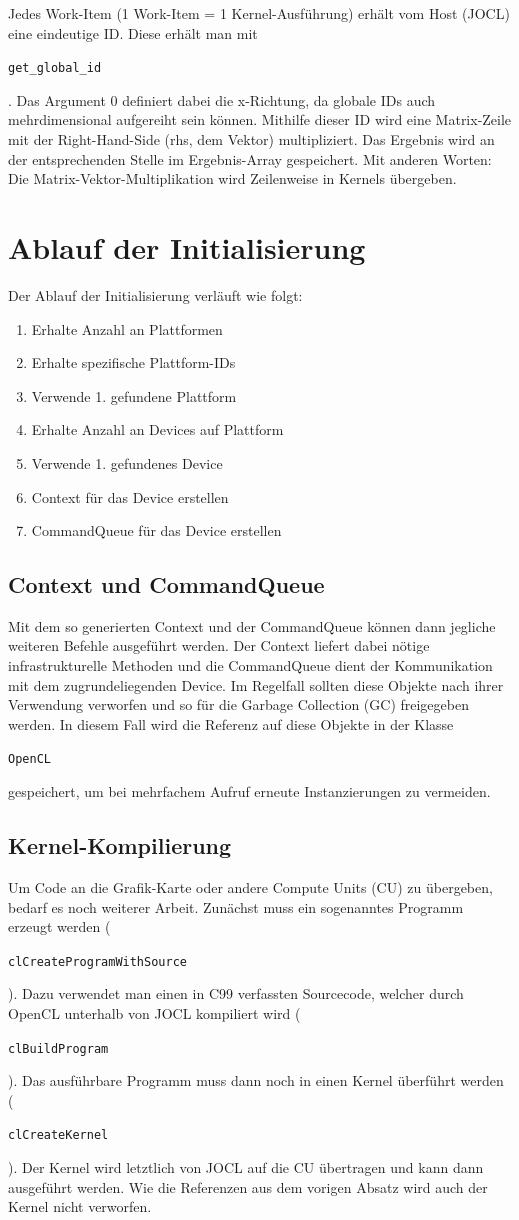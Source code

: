 \documentclass[
	ngerman,
	ruledheaders=section,
	class=report,
	thesis={type=Dokumentation},
	ignore-missing-data=true,
	accentcolor=9c,
	custommargins=false,
	marginpar=false,
	parskip=half-,
	fontsize=11pt,
]{tudapub}
\let\code\texttt
\def\code#1{\begin{small}\texttt{#1}\end{small}}
\begin{document}
Jedes Work-Item (1 Work-Item = 1 Kernel-Ausführung) erhält vom Host (JOCL) eine eindeutige ID. Diese erhält man mit \code{get\_global\_id}. Das Argument 0 definiert dabei die x-Richtung, da globale IDs auch mehrdimensional aufgereiht sein können. Mithilfe dieser ID wird eine Matrix-Zeile mit der Right-Hand-Side (rhs, dem Vektor) multipliziert. Das Ergebnis wird an der entsprechenden Stelle im Ergebnis-Array gespeichert. Mit anderen Worten: Die Matrix-Vektor-Multiplikation wird Zeilenweise in Kernels übergeben.

\section{Ablauf der Initialisierung}
Der Ablauf der Initialisierung verläuft wie folgt:
\begin{enumerate}
	\item Erhalte Anzahl an Plattformen
	\item Erhalte spezifische Plattform-IDs
	\item Verwende 1. gefundene Plattform
	\item Erhalte Anzahl an Devices auf Plattform
	\item Verwende 1. gefundenes Device
	\item Context für das Device erstellen
	\item CommandQueue für das Device erstellen	
\end{enumerate}

\subsection{Context und CommandQueue}
Mit dem so generierten Context und der CommandQueue können dann jegliche weiteren Befehle ausgeführt werden. Der Context liefert dabei nötige infrastrukturelle Methoden und die CommandQueue dient der Kommunikation mit dem zugrundeliegenden Device. Im Regelfall sollten diese Objekte nach ihrer Verwendung verworfen und so für die Garbage Collection (GC) freigegeben werden. In diesem Fall wird die Referenz auf diese Objekte in der Klasse \code{OpenCL} gespeichert, um bei mehrfachem Aufruf erneute Instanzierungen zu vermeiden.

\subsection{Kernel-Kompilierung}
Um Code an die Grafik-Karte oder andere Compute Units (CU) zu übergeben, bedarf es noch weiterer Arbeit. Zunächst muss ein sogenanntes Programm erzeugt werden (\code{clCreateProgramWithSource}). Dazu verwendet man einen in C99 verfassten Sourcecode, welcher durch OpenCL unterhalb von JOCL kompiliert wird (\code{clBuildProgram}). Das ausführbare Programm muss dann noch in einen Kernel überführt werden (\code{clCreateKernel}). Der Kernel wird letztlich von JOCL auf die CU übertragen und kann dann ausgeführt werden. Wie die Referenzen aus dem vorigen Absatz wird auch der Kernel nicht verworfen.
\end{document}

